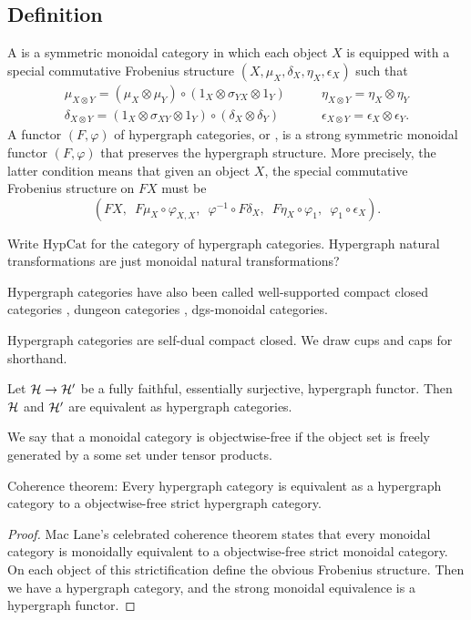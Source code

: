 \subsection{Definition}
\begin{definition}
  A  is a symmetric monoidal category in which each
  object $X$ is equipped with a special commutative Frobenius structure
  $(X,\mu_X,\delta_X,\eta_X,\epsilon_X)$ such that 
\[
  \begin{array}{cc}
    \mu_{X\otimes Y} = (\mu_X \otimes \mu_Y)\circ(1_X \otimes \sigma_{YX}\otimes
    1_Y) \qquad&
    \eta_{X\otimes Y} = \eta_X \otimes \eta_Y \\
    \delta_{X\otimes Y} = (1_X \otimes \sigma_{XY}\otimes 1_Y)\circ(\delta_X
    \otimes \delta_Y) \qquad&
    \epsilon_{X\otimes Y} = \epsilon_X \otimes \epsilon_Y.
  \end{array}
\]
A functor $(F,\varphi)$ of hypergraph categories, or , is a strong symmetric monoidal functor $(F,\varphi)$ that preserves
the hypergraph structure. More precisely, the latter condition means that given
an object $X$, the special commutative Frobenius structure on $FX$ must be 
\[
  (FX,\enspace F\mu_X \circ \varphi_{X,X},\enspace  \varphi^{-1} \circ F\delta_X,\enspace  F\eta_X \circ
\varphi_1,\enspace  \varphi_1 \circ \epsilon_X).
\]
\end{definition}

Write $\mathrm{HypCat}$ for the category of hypergraph categories. Hypergraph
natural transformations are just monoidal natural transformations?

Hypergraph categories have also been called well-supported compact closed
categories \cite{Ca}, dungeon categories \cite{Mo}, dgs-monoidal categories. 

Hypergraph categories are self-dual compact closed. We draw cups and caps for
shorthand.

\begin{proposition}
  Let $\mathcal H \to \mathcal H'$ be a fully faithful, essentially surjective, hypergraph
  functor. Then $\mathcal H$ and $\mathcal H'$ are equivalent as hypergraph categories.
\end{proposition}

We say that a monoidal category is objectwise-free if the object set is freely
generated by a some set under tensor products.

\begin{proposition}
  Coherence theorem: Every hypergraph category is equivalent as a hypergraph category to a
  objectwise-free strict hypergraph category.
\end{proposition}
\begin{proof}
  Mac Lane's celebrated coherence theorem states that every monoidal category is
  monoidally equivalent to a objectwise-free strict monoidal category. On each
  object of this strictification define the obvious Frobenius structure. Then
  we have a hypergraph category, and the strong monoidal equivalence is a
  hypergraph functor.
\end{proof}


